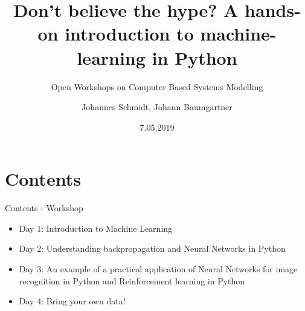 \documentclass[color=usenames,dvipsnames]{beamer}
\title[Workshop - Machine Learning]{ Don't believe the hype? A hands-on introduction to machine-learning in Python}
\subtitle{Open Workshops on Computer Based Systems Modelling}
\author{Johannes Schmidt, Johann Baumgartner}
\institute{Institute for Sustainable Economic Development, BOKU, Vienna}
\date{7.05.2019}
\begin{document}
{


\begin{frame}

\maketitle



\end{frame}
}

\section{Contents}

\begin{frame}{Contents - Workshop}

\begin{itemize}
  \item Day 1: Introduction to Machine Learning
  \item Day 2: Understanding backpropagation and Neural Networks in Python
  \item Day 3: An example of a practical application of Neural Networks for image recognition in Python and Reinforcement learning in Python
  \item Day 4: Bring your own data!
\end{itemize}

\end{frame}
\end{document}
